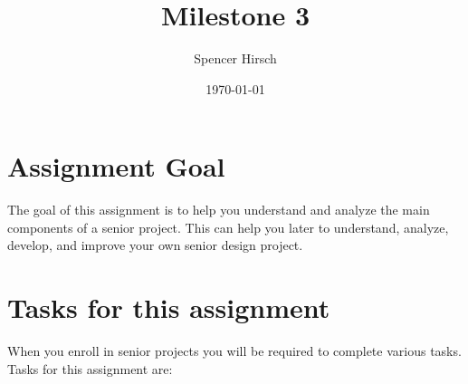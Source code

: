 \documentclass{article}
\begin{document}
\title{\textbf{Milestone 3}}
\author{Spencer Hirsch}
\date{\today}

\maketitle

\section*{Assignment Goal}
The goal of this assignment is to help you understand and analyze the main
components of a senior project. This can help you later to understand, analyze,
develop, and improve your own senior design project.

\section*{Tasks for this assignment}
When you enroll in senior projects you will be required to complete various tasks.
Tasks for this assignment are: \\
\end{document}

